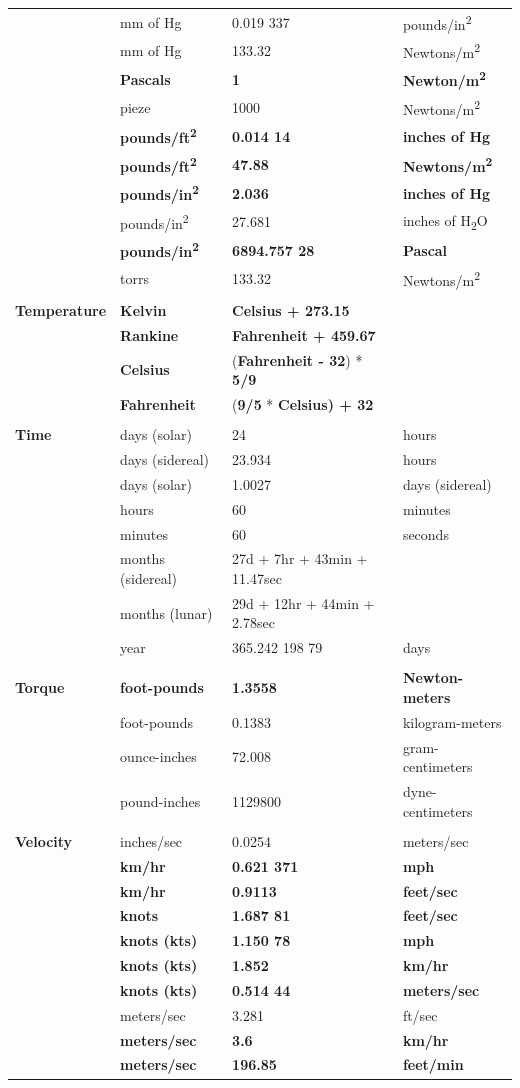 \documentclass[
]{book}
\begin{document}
\begin{longtable}[]{@{}llll@{}}
& mm of Hg & 0.019 337 & pounds/in\textsuperscript{2}\tabularnewline
& mm of Hg & 133.32 & Newtons/m\textsuperscript{2}\tabularnewline
& \textbf{Pascals} & \textbf{1} & \textbf{Newton/m\textsuperscript{2}}\tabularnewline
& pieze & 1000 & Newtons/m\textsuperscript{2}\tabularnewline
& \textbf{pounds/ft\textsuperscript{2}} & \textbf{0.014 14} & \textbf{inches of Hg}\tabularnewline
& \textbf{pounds/ft\textsuperscript{2}} & \textbf{47.88} & \textbf{Newtons/m\textsuperscript{2}}\tabularnewline
& \textbf{pounds/in\textsuperscript{2}} & \textbf{2.036} & \textbf{inches of Hg}\tabularnewline
& pounds/in\textsuperscript{2} & 27.681 & inches of H\textsubscript{2}O\tabularnewline
& \textbf{pounds/in\textsuperscript{2}} & \textbf{6894.757 28} & \textbf{Pascal}\tabularnewline
& torrs & 133.32 & Newtons/m\textsuperscript{2}\tabularnewline
& & &\tabularnewline
\textbf{Temperature} & \textbf{Kelvin} & \textbf{Celsius + 273.15} &\tabularnewline
& \textbf{Rankine} & \textbf{Fahrenheit + 459.67} &\tabularnewline
& \textbf{Celsius} & (\textbf{Fahrenheit - 32}) * \textbf{5/9} &\tabularnewline
& \textbf{Fahrenheit} & (\textbf{9/5} * \textbf{Celsius) + 32} &\tabularnewline
& & &\tabularnewline
\textbf{Time} & days (solar) & 24 & hours\tabularnewline
& days (sidereal) & 23.934 & hours\tabularnewline
& days (solar) & 1.0027 & days (sidereal)\tabularnewline
& hours & 60 & minutes\tabularnewline
& minutes & 60 & seconds\tabularnewline
& months (sidereal) & 27d + 7hr + 43min + 11.47sec &\tabularnewline
& months (lunar) & 29d + 12hr + 44min + 2.78sec &\tabularnewline
& year & 365.242 198 79 & days\tabularnewline
& & &\tabularnewline
\textbf{Torque} & \textbf{foot-pounds} & \textbf{1.3558} & \textbf{Newton-meters}\tabularnewline
& foot-pounds & 0.1383 & kilogram-meters\tabularnewline
& ounce-inches & 72.008 & gram-centimeters\tabularnewline
& pound-inches & 1129800 & dyne-centimeters\tabularnewline
& & &\tabularnewline
\textbf{Velocity} & inches/sec & 0.0254 & meters/sec\tabularnewline
& \textbf{km/hr} & \textbf{0.621 371} & \textbf{mph}\tabularnewline
& \textbf{km/hr} & \textbf{0.9113} & \textbf{feet/sec}\tabularnewline
& \textbf{knots} & \textbf{1.687 81} & \textbf{feet/sec}\tabularnewline
& \textbf{knots (kts)} & \textbf{1.150 78} & \textbf{mph}\tabularnewline
& \textbf{knots (kts)} & \textbf{1.852} & \textbf{km/hr}\tabularnewline
& \textbf{knots (kts)} & \textbf{0.514 44} & \textbf{meters/sec}\tabularnewline
& meters/sec & 3.281 & ft/sec\tabularnewline
& \textbf{meters/sec} & \textbf{3.6} & \textbf{km/hr}\tabularnewline
& \textbf{meters/sec} & \textbf{196.85} & \textbf{feet/min}\tabularnewline

\end{longtable}
\end{document}
